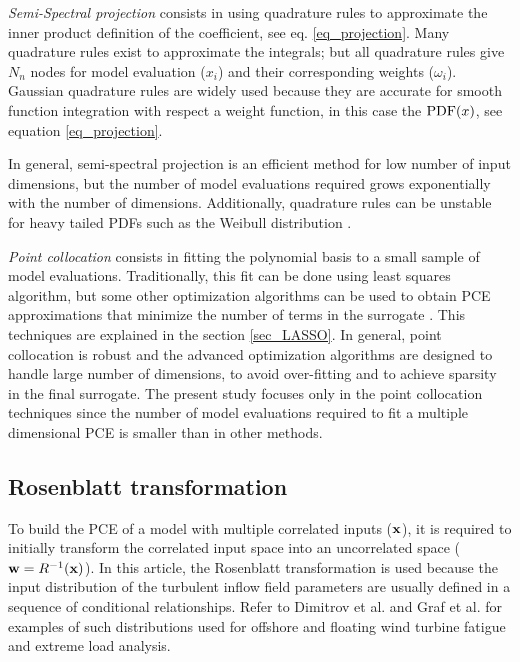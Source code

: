 \documentclass[preprint,12pt]{elsarticle}
\begin{document}
\emph{Semi-Spectral projection} consists in using quadrature rules to approximate the inner product definition of the coefficient, see eq. \ref{eq_projection}. Many quadrature rules exist to approximate the integrals; but all quadrature rules give $N_n$ nodes for model evaluation ($x_i$) and their corresponding weights ($\omega_i$). Gaussian quadrature rules are widely used because they are accurate for smooth function integration with respect a weight function, in this case the $\mathrm{PDF}(x)$, see equation \ref{eq_projection}.


\noindent In general, semi-spectral projection is an efficient method for low number of input dimensions, but the number of model evaluations required grows exponentially with the number of dimensions. Additionally, quadrature rules can be unstable for heavy tailed PDFs such as the Weibull distribution \cite{gautschi1994algorithm}.

\emph{Point collocation} consists in fitting the polynomial basis to a small sample of model evaluations. Traditionally, this fit can be done using least squares algorithm, but some other optimization algorithms can be used to obtain PCE approximations that minimize the number of  terms in the surrogate \cite{blatman2011adaptive,pedregosa2011scikit,tibshirani1996regression}. This techniques are explained in the section \ref{sec_LASSO}. In general, point collocation is robust and the advanced optimization algorithms are designed to handle large number of dimensions, to avoid over-fitting and to achieve sparsity in the final surrogate. The present study focuses only in the point collocation techniques since the number of model evaluations required to fit a multiple dimensional PCE is smaller \cite{blatman2011adaptive} than in other methods.

\subsection{Rosenblatt transformation}

To build the PCE of a model with multiple correlated inputs ($\mathbf{x}$), it is required to initially transform the correlated input space into an uncorrelated space ($\mathbf{w}=R^{-1}(\mathbf{x})$). In this article, the Rosenblatt transformation is used because the input distribution of the turbulent inflow field parameters are usually defined in a sequence of conditional relationships. Refer to Dimitrov et al. \cite{dimitrov2015model} and Graf et al. \cite{graf2015high} for examples of such distributions used for offshore and floating wind turbine fatigue and extreme load analysis.
\end{document}
